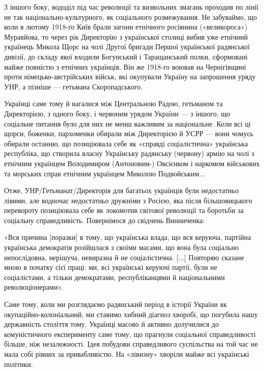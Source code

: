 З іншого боку, вододіл під час революції та визвольних змагань проходив по
лінії не так національно-культурного, як соціального розмежування. Не
забуваймо, що коли в лютому 1918-го Київ брали загони етнічного росіянина
(«великороса») Муравйова, то через рік Директорію з української столиці вибив
уже етнічний українець Микола Щорс на чолі Другої бригади Першої української
радянської дивізії, до складу якої входили Богунський і Таращанський полки,
сформовані майже повністю з етнічних українців. Він же 1918-го воював на
Чернігівщині проти німецько-австрійських військ, які окупували Україну на
запрошення уряду УНР, а пізніше — гетьмана Скоропадського.

Українці саме тому й вагалися між Центральною Радою, гетьманом та Директорією,
з одного боку, і червоним урядом України — з іншого, що соціальне питання було
для них не менш важливим за національне. Коли всі ці щорси, боженки, пархоменки
обирали між Директорією й УСРР — вони чомусь обирали останню, що позиціювала
себе як «справді соціалістична» українська республіка, що створила власну
Українську радянську (червону) армію на чолі з етнічним українцем Володимиром
(Антоновим-) Овсієнком і наркомом військових та морських справ етнічним
українцем Миколою Подвойським...

Отже, УНР/Гетьманат/Директорія для багатьох українців були недостатньо лівими,
але водночас недостатньо дружніми з Росією, яка після більшовицького перевороту
позиціювала себе як локомотив світової революції та боротьби за соціальну
справедливість. Повернімося до свідчень Винниченка: 

\begin{zzquote}
«Вся причина [поразки] в тому, що українська влада, що вся керуюча, партійна
українська демократія розійшлася з своїми масами, що вона була соціально
непослідовна, нерішуча, невиразна й не соціалістична. [...] Повторяю сказане мною
в початку сієї праці: ми, всі українські керуючі партії, були не соціалістами,
а тільки демократами, республіканцями й національними революціонерами».
\end{zzquote}

Саме тому, коли ми розглядаємо радянський період в історії України як
окупаційно-колоніальний, ми ставимо хибний діагноз хворобі, що погубила нашу
державність століття тому. Українці масово й активно долучилися до
комуністичного експерименту саме тому, що прагнули соціальної справедливості
більше, ніж незалежності. Ідея побудови справедливого суспільства на той час не
мала собі рівних за привабливістю. На «лівизну» хворіли майже всі українські
політики.

